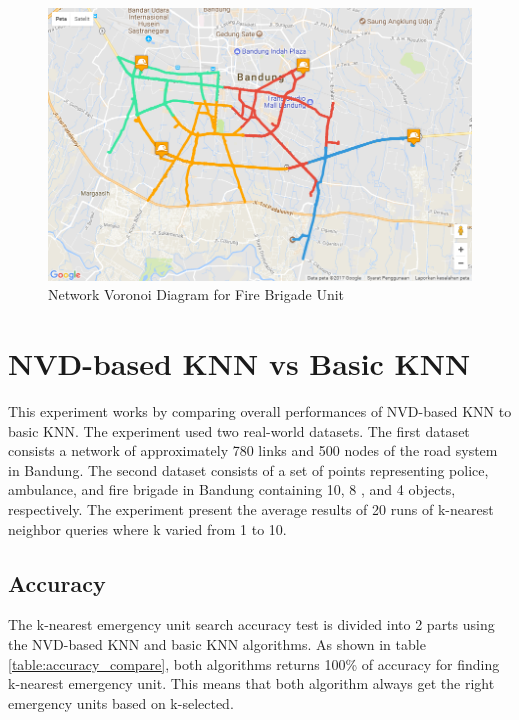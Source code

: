 \begin{figure}[H]
    \centering
    \includegraphics[scale=0.6]{v_nvd_fbg.png}
    \caption{Network Voronoi Diagram for Fire Brigade Unit}
    \label{fig:nvd_fbg}
\end{figure}

\pagebreak
\section{NVD-based KNN vs Basic KNN}
This experiment works by comparing overall performances of NVD-based KNN to basic KNN. The experiment used two real-world datasets. The first dataset consists a network of approximately 780 links and 500 nodes of the road system in Bandung. The second dataset consists of a set of points representing police, ambulance, and fire brigade in Bandung containing 10, 8 , and 4 objects, respectively. The experiment present the average results of 20 runs of k-nearest neighbor queries where k varied from 1 to 10.

\subsection{Accuracy}
The k-nearest emergency unit search accuracy test is divided into 2 parts using the NVD-based KNN and basic KNN algorithms. As shown in table \ref{table:accuracy_compare}, both algorithms returns 100\% of accuracy for finding k-nearest emergency unit. This means that both algorithm always get the right emergency units based on k-selected.

